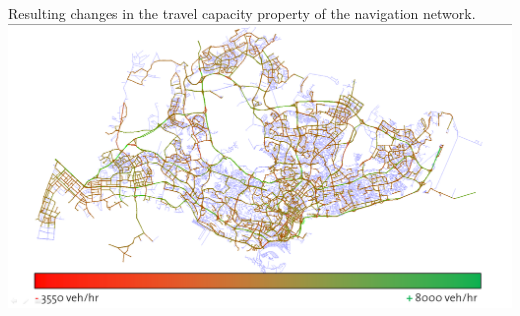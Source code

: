 \createfigure
{}
{Resulting changes in the travel capacity property of the navigation network.}
{\label{fig:Results}}
{\includegraphics[width=1.0\textwidth]{extending/figures/netEdSing/Result.png}}
{}

